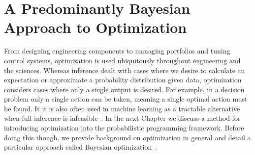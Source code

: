 
\chapter{A Predominantly Bayesian Approach to Optimization}
\label{chp:opt}

From designing engineering components to managing portfolios and tuning control systems,
optimization is used ubiquitously throughout engineering and the sciences.   Whereas inference
dealt with cases where we desire to calculate an expectation or approximate a probability distribution
given data, optimization considers cases where only a single output is desired.  For example, in
a decision problem only a single action can be taken, meaning a single optimal action must be
found.  It it is also often used in machine learning as a tractable alternative when full inference
is infeasible~\citep{murphy2012machine}.  In the next Chapter we discuss a method for introducing
optimization into the probabilistic programming framework.  Before doing this though, we provide
background on optimization in general and detail a particular approach called Bayesian
optimization~\cite{jones1998efficient,shahriari2016taking}.


%



